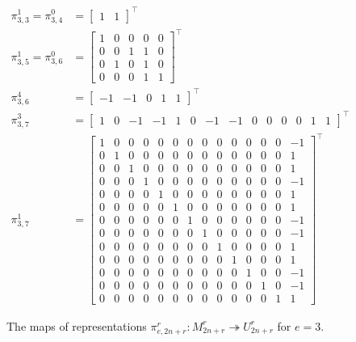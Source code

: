 \documentclass{amsart}
\begin{document}
\begin{figure}[h]
\begin{align*} 
  \pi_{3,3}^1 = \pi_{3,4}^0 &=  
\begin{bmatrix}
  1 & 1
\end{bmatrix}^\intercal\\
\pi_{3,5}^1 = \pi_{3,6}^0&=  
\begin{bmatrix}
  1 & 0 & 0 & 0 & 0\\
  0 & 0 & 1 & 1 & 0\\
  0 & 1 & 0 & 1 & 0\\
  0 & 0 & 0 & 1 & 1
\end{bmatrix}^\intercal\\
\pi_{3,6}^4&=  
\begin{bmatrix}
  -1 & -1 & 0 & 1 & 1
\end{bmatrix}^\intercal\\
\pi_{3,7}^3&=  
\begin{bmatrix}
 1 & 0 &-1 &-1 & 1 & 0 & -1 & -1 & 0 & 0 & 0 & 0 & 1 & 1
\end{bmatrix}^\intercal\\
\pi_{3,7}^1&=  
\begin{bmatrix}
 1 & 0 & 0 & 0 & 0 & 0 & 0 & 0 & 0 & 0 & 0 & 0 & 0 &-1\\
 0 & 1 & 0 & 0 & 0 & 0 & 0 & 0 & 0 & 0 & 0 & 0 & 0 & 1\\
 0 & 0 & 1 & 0 & 0 & 0 & 0 & 0 & 0 & 0 & 0 & 0 & 0 & 1\\
 0 & 0 & 0 & 1 & 0 & 0 & 0 & 0 & 0 & 0 & 0 & 0 & 0 &-1\\
 0 & 0 & 0 & 0 & 1 & 0 & 0 & 0 & 0 & 0 & 0 & 0 & 0 & 1\\
 0 & 0 & 0 & 0 & 0 & 1 & 0 & 0 & 0 & 0 & 0 & 0 & 0 & 1\\
 0 & 0 & 0 & 0 & 0 & 0 & 1 & 0 & 0 & 0 & 0 & 0 & 0 &-1\\
 0 & 0 & 0 & 0 & 0 & 0 & 0 & 1 & 0 & 0 & 0 & 0 & 0 &-1\\
 0 & 0 & 0 & 0 & 0 & 0 & 0 & 0 & 1 & 0 & 0 & 0 & 0 & 1\\
 0 & 0 & 0 & 0 & 0 & 0 & 0 & 0 & 0 & 1 & 0 & 0 & 0 & 1\\
 0 & 0 & 0 & 0 & 0 & 0 & 0 & 0 & 0 & 0 & 1 & 0 & 0 &-1\\
 0 & 0 & 0 & 0 & 0 & 0 & 0 & 0 & 0 & 0 & 0 & 1 & 0 &-1\\
 0 & 0 & 0 & 0 & 0 & 0 & 0 & 0 & 0 & 0 & 0 & 0 & 1 & 1
\end{bmatrix}^\intercal
\end{align*}
\caption{The maps of representations $\pi_{e,2n+r}^r:M_{2n + r}^r \twoheadrightarrow U_{2n+r}^r$ for $e = 3$.}
\label{Composition series e=3}
\end{figure}
  
\end{document}
